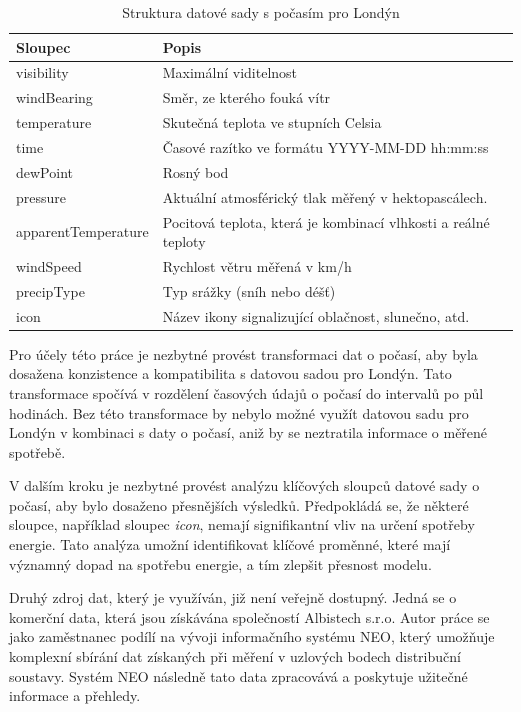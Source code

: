\documentclass[FM,BP,fonts]{tulthesis}
\begin{document}
\begin{table}[!ht]
	\centering
	\caption{Struktura datové sady s počasím pro Londýn}
	\label{weather_dataset}
	\begin{tabularx}{\linewidth}{lX}
		\hline
		\textbf{Sloupec} & \textbf{Popis} \\ \hline
		visibility & Maximální viditelnost \\ 
		windBearing & Směr, ze kterého fouká vítr \\ 
		temperature & Skutečná teplota ve stupních Celsia \\ 
		time & Časové razítko ve formátu YYYY-MM-DD hh:mm:ss	 \\ 
		dewPoint & Rosný bod \\ 
		pressure & Aktuální atmosférický tlak měřený v hektopascálech. \\ 
		apparentTemperature & Pocitová teplota, která je kombinací vlhkosti a reálné teploty \\ 
		windSpeed & Rychlost větru měřená v km/h \\ 
		precipType & Typ srážky (sníh nebo déšť) \\
		icon & Název ikony signalizující oblačnost, slunečno, atd.  \\ 
		\hline
	\end{tabularx}
\end{table}


Pro účely této práce je nezbytné provést transformaci dat o počasí, aby byla dosažena konzistence a kompatibilita s datovou sadou pro Londýn. Tato transformace spočívá v rozdělení časových údajů o počasí do intervalů po půl hodinách. Bez této transformace by nebylo možné využít datovou sadu pro Londýn v kombinaci s daty o počasí, aniž by se neztratila informace o měřené spotřebě.

V dalším kroku je nezbytné provést analýzu klíčových sloupců datové sady o počasí, aby bylo dosaženo přesnějších výsledků. Předpokládá se, že některé sloupce, například sloupec \textit{icon}, nemají signifikantní vliv na určení spotřeby energie. Tato analýza umožní identifikovat klíčové proměnné, které mají významný dopad na spotřebu energie, a tím zlepšit přesnost modelu.

Druhý zdroj dat, který je využíván, již není veřejně dostupný. Jedná se o komerční data, která jsou získávána společností Albistech s.r.o. Autor práce se jako zaměstnanec podílí na vývoji informačního systému NEO, který umožňuje komplexní sbírání dat získaných při měření v uzlových bodech distribuční soustavy. Systém NEO následně tato data zpracovává a poskytuje užitečné informace a přehledy.
\end{document}
